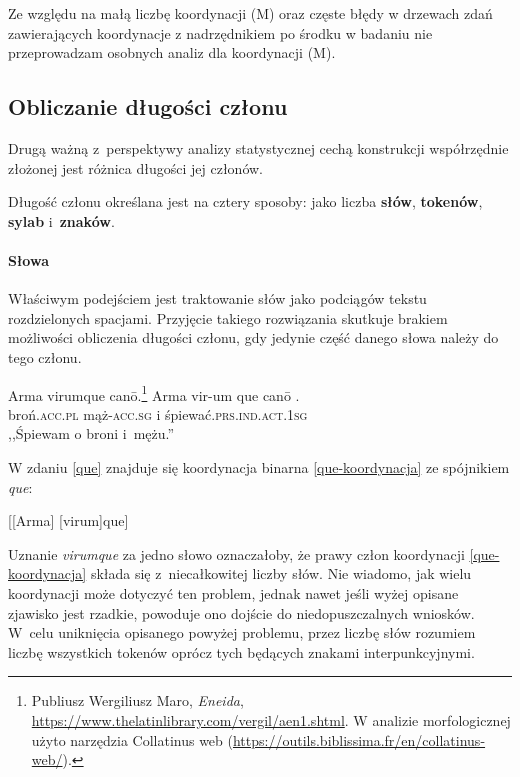 Ze względu na małą liczbę koordynacji (M) oraz częste błędy w drzewach zdań zawierających koordynacje z nadrzędnikiem po środku w badaniu nie przeprowadzam osobnych analiz dla koordynacji (M).

\subsection{Obliczanie długości członu}

Drugą ważną z~perspektywy analizy statystycznej cechą konstrukcji współrzędnie złożonej jest różnica długości jej członów.

Długość członu określana jest na cztery sposoby: jako liczba \textbf{słów}, \textbf{tokenów}, \textbf{sylab} i~\textbf{znaków}.

\paragraph{Słowa}
Właściwym podejściem jest traktowanie słów jako podciągów tekstu rozdzielonych spacjami. Przyjęcie takiego rozwiązania skutkuje brakiem możliwości obliczenia długości członu, gdy jedynie część danego słowa należy do tego członu.

\begin{exe}
\ex  \label{que}
Arma virumque canō.\footnote{Publiusz Wergiliusz Maro, \textit{Eneida},
\url{https://www.thelatinlibrary.com/vergil/aen1.shtml}. W analizie morfologicznej użyto narzędzia Collatinus web (\url{https://outils.biblissima.fr/en/collatinus-web/}).}
\gll Arma vir-um que canō . \\
broń\textsc{.acc.pl} mąż\textsc{-acc.sg} i śpiewać\textsc{.prs.ind.act.1sg} \\
\glt ,,Śpiewam o broni i~mężu.''
\end{exe}

W zdaniu \eqref{que} znajduje się koordynacja binarna \eqref{que-koordynacja} ze spójnikiem \textit{que}:

\begin{exe}
\ex \label{que-koordynacja}
{[[Arma] [virum]que]}
\end{exe}

Uznanie \textit{virumque} za jedno słowo oznaczałoby, że prawy człon koordynacji \eqref{que-koordynacja} składa się z~niecałkowitej liczby słów. Nie wiadomo, jak wielu koordynacji może dotyczyć ten problem, jednak nawet jeśli wyżej opisane zjawisko jest rzadkie, powoduje ono dojście do niedopuszczalnych wniosków. W~celu uniknięcia opisanego powyżej problemu, przez liczbę słów rozumiem liczbę wszystkich tokenów oprócz tych będących znakami interpunkcyjnymi. 

